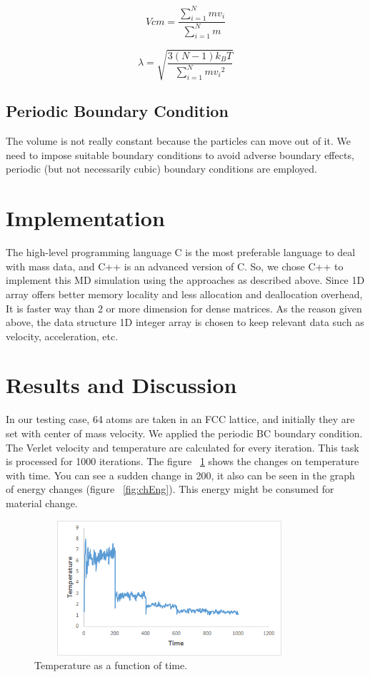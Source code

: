 \documentclass[]{article}
\begin{document}
\begin{equation}
\label{eq:eight}
Vcm = \frac{\sum_{i=1}^N{mv_i}}{\sum_{i=1}^N{m}}
\end{equation}

\begin{equation}
\label{eq:nine}
\lambda =\sqrt{ \frac{3(N-1)k_BT}{\sum_{i=1}^N{m{v_i}^2}}}
\end{equation}

\subsection{\label{sec:level2.4} Periodic Boundary Condition}

The volume is not really constant because the particles can move out of it. We need to impose suitable boundary conditions to avoid adverse boundary effects, periodic (but not necessarily cubic) boundary conditions are employed.

\section{Implementation}
The high-level programming language C is the most preferable language to deal with mass data, and C++ is an advanced version of C. So, we chose C++ to implement this MD simulation using the approaches as described above. Since 1D array offers better memory locality and less allocation and deallocation overhead, It is faster way than 2 or more dimension for dense matrices. As the reason given above, the data structure 1D integer array is chosen to keep relevant data such as velocity, acceleration, etc.  

\section{Results and Discussion}
In our testing case, 64 atoms are taken in an FCC lattice, and initially they are set with center of mass velocity. We applied the periodic BC boundary condition. The Verlet velocity and temperature are calculated for every iteration. This task is processed for 1000 iterations. The figure ~\ref{fig:Temp_time} shows the changes on temperature with time. You can see a sudden change in 200, it also can be seen in the graph of energy changes (figure ~\ref{fig:chEng}). This energy might be consumed for material change.

\begin{figure}[h]
  \centering
  \includegraphics[width=10cm,height=5cm]{figures/Temp_time}
  \caption{\label{fig:Temp_time} Temperature as a function of time.}
\end{figure}
\end{document}
